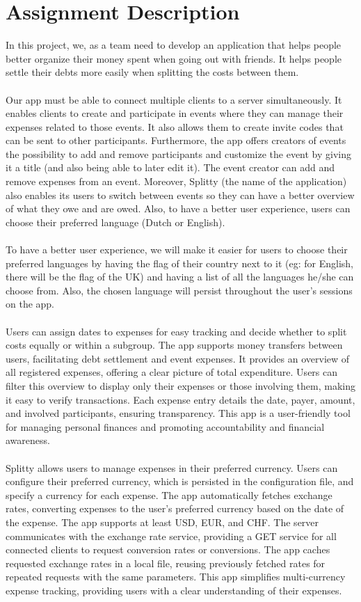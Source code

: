 \section{Assignment Description}
In this project, we, as a team need to develop an application that helps people better organize their money spent when going out with friends. It helps people settle their debts more easily when splitting the costs between them.
\\\\
Our app must be able to connect multiple clients to a server simultaneously. It enables clients to create and participate in events where they can manage their expenses related to those events. It also allows them to create invite codes that can be sent to other participants. Furthermore, the app offers creators of events the possibility to add and remove participants and customize the event by giving it a title (and also being able to later edit it). The event creator can add and remove expenses from an event. Moreover, Splitty (the name of the application) also enables its users to switch between events so they can have a better overview of what they owe and are owed. Also, to have a better user experience, users can choose their preferred language (Dutch or English).
\\\\
To have a better user experience, we will make it easier for users to choose their preferred languages by having the flag of their country next to it (eg: for English, there will be the flag of the UK) and having a list of all the languages he/she can choose from. Also, the chosen language will persist throughout the user's sessions on the app. 
\\\\
 Users can assign dates to expenses for easy tracking and decide whether to split costs equally or within a subgroup. The app supports money transfers between users, facilitating debt settlement and event expenses. It provides an overview of all registered expenses, offering a clear picture of total expenditure. Users can filter this overview to display only their expenses or those involving them, making it easy to verify transactions. Each expense entry details the date, payer, amount, and involved participants, ensuring transparency. This app is a user-friendly tool for managing personal finances and promoting accountability and financial awareness.
 \\\\
Splitty allows users to manage expenses in their preferred currency. Users can configure their preferred currency, which is persisted in the configuration file, and specify a currency for each expense. The app automatically fetches exchange rates, converting expenses to the user’s preferred currency based on the date of the expense. The app supports at least USD, EUR, and CHF. The server communicates with the exchange rate service, providing a GET service for all connected clients to request conversion rates or conversions. The app caches requested exchange rates in a local file, reusing previously fetched rates for repeated requests with the same parameters. This app simplifies multi-currency expense tracking, providing users with a clear understanding of their expenses.
